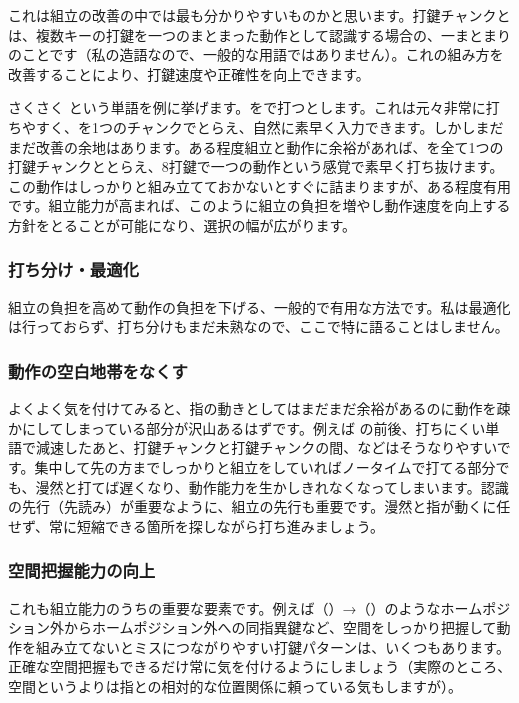 これは組立の改善の中では最も分かりやすいものかと思います。打鍵チャンクとは、複数キーの打鍵を一つのまとまった動作として認識する場合の、一まとまりのことです（私の造語なので、一般的な用語ではありません）。これの組み方を改善することにより、打鍵速度や正確性を向上できます。

さくさく という単語を例に挙げます。をで打つとします。これは元々非常に打ちやすく、を1つのチャンクでとらえ、自然に素早く入力できます。しかしまだまだ改善の余地はあります。ある程度組立と動作に余裕があれば、を全て1つの打鍵チャンクととらえ、8打鍵で一つの動作という感覚で素早く打ち抜けます。この動作はしっかりと組み立てておかないとすぐに詰まりますが、ある程度有用です。組立能力が高まれば、このように組立の負担を増やし動作速度を向上する方針をとることが可能になり、選択の幅が広がります。

\subsubsection*{打ち分け・最適化}

組立の負担を高めて動作の負担を下げる、一般的で有用な方法です。私は最適化は行っておらず、打ち分けもまだ未熟なので、ここで特に語ることはしません。

\subsubsection*{動作の空白地帯をなくす}

よくよく気を付けてみると、指の動きとしてはまだまだ余裕があるのに動作を疎かにしてしまっている部分が沢山あるはずです。例えば の前後、打ちにくい単語で減速したあと、打鍵チャンクと打鍵チャンクの間、などはそうなりやすいです。集中して先の方までしっかりと組立をしていればノータイムで打てる部分でも、漫然と打てば遅くなり、動作能力を生かしきれなくなってしまいます。認識の先行（先読み）が重要なように、組立の先行も重要です。漫然と指が動くに任せず、常に短縮できる箇所を探しながら打ち進みましょう。

\subsubsection*{空間把握能力の向上}

これも組立能力のうちの重要な要素です。例えば（）→（）のようなホームポジション外からホームポジション外への同指異鍵など、空間をしっかり把握して動作を組み立てないとミスにつながりやすい打鍵パターンは、いくつもあります。正確な空間把握もできるだけ常に気を付けるようにしましょう（実際のところ、空間というよりは指との相対的な位置関係に頼っている気もしますが）。

